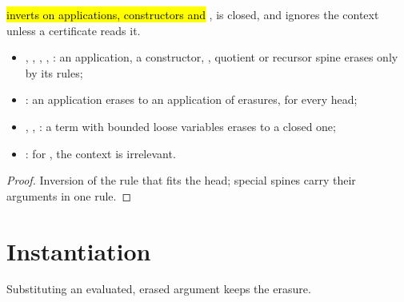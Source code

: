 \begin{lemma}
  \label{lem:EraseProof-Erases-app-inv}
  \leanok
   \hl{ inverts on applications, constructors and }, is closed, and ignores the context unless a certificate reads it.
  \begin{itemize}
  \item {}, , , , : an application, a constructor, , quotient or recursor spine erases only by its rules;
  \item {}: an application erases to an application of erasures, for every head;
  \item {}, , : a term with bounded loose variables erases to a closed one;
  \item {}: for , the context is irrelevant.
  \end{itemize}
\end{lemma}
\begin{proof}
  \leanok
   Inversion of the rule that fits the head; special spines carry their arguments in one rule.
\end{proof}

\section{Instantiation}\label{sec:relation-inst}

Substituting an evaluated, erased argument keeps the erasure.

